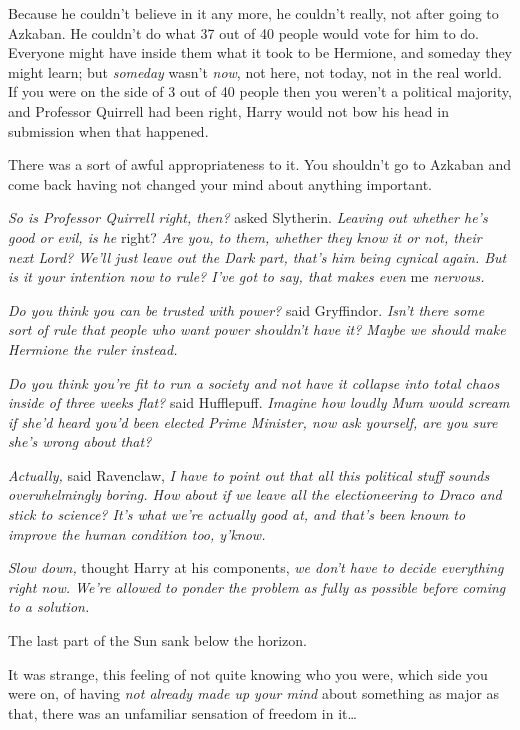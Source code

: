Because he couldn't believe in it any more, he couldn't really, not after going 
to Azkaban. He couldn't do what 37 out of 40 people would vote for him to do. 
Everyone might have inside them what it took to be Hermione, and someday they 
might learn; but \emph{someday} wasn't \emph{now}, not here, not today, not in 
the real world. If you were on the side of 3 out of 40 people then you weren't 
a political majority, and Professor Quirrell had been right, Harry would not 
bow his head in submission when that happened.

There was a sort of awful appropriateness to it. You shouldn't go to Azkaban 
and come back having not changed your mind about anything important.

\emph{So is Professor Quirrell right, then?} asked Slytherin. \emph{Leaving out 
whether he's good or evil, is he} right? \emph{Are you, to them, whether they 
know it or not, their next Lord? We'll just leave out the Dark part, that's him 
being cynical again. But is it your intention now to rule? I've got to say, 
that makes even} me \emph{nervous.}

\emph{Do you think you can be trusted with power?} said Gryffindor. \emph{Isn't 
there some sort of rule that people who want power shouldn't have it? Maybe we 
should make Hermione the ruler instead.\\
}

\emph{Do you think you're fit to run a society and not have it collapse into 
total chaos inside of three weeks flat?} said Hufflepuff. \emph{Imagine how 
loudly Mum would scream if she'd heard you'd been elected Prime Minister, now 
ask yourself, are you sure she's wrong about that?}

\emph{Actually,} said Ravenclaw, \emph{I have to point out that all this 
political stuff sounds overwhelmingly boring. How about if we leave all the 
electioneering to Draco and stick to science? It's what we're actually good at, 
and that's been known to improve the human condition too, y'know.}

\emph{Slow down,} thought Harry at his components, \emph{we don't have to 
decide everything right now. We're allowed to ponder the problem as fully as 
possible before coming to a solution.}

The last part of the Sun sank below the horizon.

It was strange, this feeling of not quite knowing who you were, which side you 
were on, of having \emph{not already made up your mind} about something as 
major as that, there was an unfamiliar sensation of freedom in it{\ldots}

